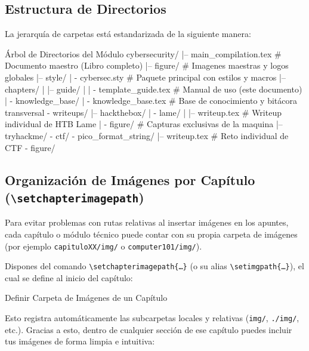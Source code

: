 \documentclass[../../main_compilation.tex]{subfiles}
\begin{document}
\subsection{Estructura de Directorios}
La jerarquía de carpetas está estandarizada de la siguiente manera:

\begin{codebox}[text]{Árbol de Directorios del Módulo}
	cybersecurity/
	|-- main_compilation.tex         # Documento maestro (Libro completo)
	|-- figure/                      # Imagenes maestras y logos globales
	|-- style/
	|   \-- cybersec.sty             # Paquete principal con estilos y macros
	|-- chapters/
	|   |-- guide/
	|   |   \-- template_guide.tex   # Manual de uso (este documento)
	|   \-- knowledge_base/
	|       \-- knowledge_base.tex   # Base de conocimiento y bitácora transversal
	\-- writeups/
	    |-- hackthebox/
	    |   \-- lame/
	    |       |-- writeup.tex      # Writeup individual de HTB Lame
	    |       \-- figure/          # Capturas exclusivas de la maquina
	    |-- tryhackme/
	    \-- ctf/
	        \-- pico_format_string/
	            |-- writeup.tex      # Reto individual de CTF
	            \-- figure/
\end{codebox}

\subsection{Organización de Imágenes por Capítulo (\texttt{\textbackslash setchapterimagepath})}
Para evitar problemas con rutas relativas al insertar imágenes en los apuntes, cada capítulo o módulo técnico puede contar con su propia carpeta de imágenes (por ejemplo \texttt{capituloXX/img/} o \texttt{computer101/img/}).

Dispones del comando \texttt{\textbackslash setchapterimagepath\{\ldots\}} (o su alias \texttt{\textbackslash setimgpath\{\ldots\}}), el cual se define al inicio del capítulo:

\begin{codebox}[latex]{Definir Carpeta de Imágenes de un Capítulo}
\end{codebox}

Esto registra automáticamente las subcarpetas locales y relativas (\texttt{img/}, \texttt{./img/}, etc.). Gracias a esto, dentro de cualquier sección de ese capítulo puedes incluir tus imágenes de forma limpia e intuitiva:
\end{document}
